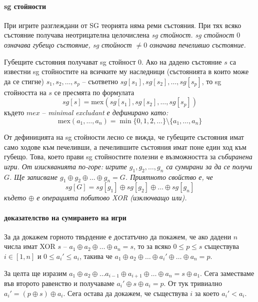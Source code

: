 \documentclass[a4paper]{article}
\begin{document}
    \paragraph{sg стойности}
    При игрите разглеждани от SG  теорията няма реми състояния. При тях всяко
    състояние получава неотрицателна целочислена \em sg стойност\em. sg
    стойност $0$ означава губещо състояние, sg стойност $\neq 0$ означава
    печелившо състояние.

    Губещите състояния получават sg стойност $0$. Ако на дадено състояние $s$
    са известни sg стойностите на всичките му наследници (състоянията в които
    може да се стигне) $s_1, s_2, \dots, s_p$ -- съответно $sg[s_1], sg[s_2],
    \dots, sg[s_p]$, то sg стойността на $s$ се пресмята по формулата
    $$
      sg[s] = \mathrm{mex}(sg[s_1], sg[s_2], \dots, sg[s_p])
    $$
    където $mex$ -- \em{}minimal excludant \em е дефинирано като:
    $$
      \mathrm{mex}(a_1, \dots, a_n) = \min \{ 0, 1, 2, \dots \} \setminus \{ a_1, \dots, a_n \}
    $$

    От дефиницията на sg стойности лесно се вижда, че губещите състояния имат
    само ходове към печеливши, а печелившите състояния имат поне един ход към
    губещо. Това, което прави sg стойностите полезни е възможността за
    \em{}събиране\em на игри. От изискванията по-горе: игрите $g_1, g_2, \dots,
    g_n$ са сумирани за да се получи $G$. Ще записваме $g_1 \oplus g_2 \oplus
    \dots \oplus g_n = G$. Приятното свойство е, че $$sg[G] = sg[g_1] \oplus
    sg[g_2] \oplus \dots \oplus sg[g_n]$$ където $\oplus$ е операцията побитово
    XOR (изключващо или).

    \paragraph{доказателство на сумирането на игри}
    За да докажем горното твърдение е достатъчно да покажем, че ако дадени $n$
    числа имат XOR $s$ -- $a_1 \oplus a_2 \oplus \dots \oplus a_n = s$, то за
    всяко $0 \le p \le s$ съществува $i \in [1, n]$ и $0 \le a_i' \le a_i$,
    такива че $a_1 \oplus a_2 \oplus \dots \oplus a_i' \oplus \dots \oplus a_n
    = p$.

    За целта ще изразим $a_1 \oplus a_2 \oplus \dots a_{i-1} \oplus a_{i+1}
    \oplus \dots \oplus a_n = s \oplus a_1$. Сега заместваме във второто
    равенство и получаваме $a_i' \oplus s \oplus a_i = p$. От тук тривиално
    $a_i' = (p \oplus s) \oplus a_i$. Сега остава да докажем, че съществува $i$
    за което $a_i' < a_i$.
\end{document}
